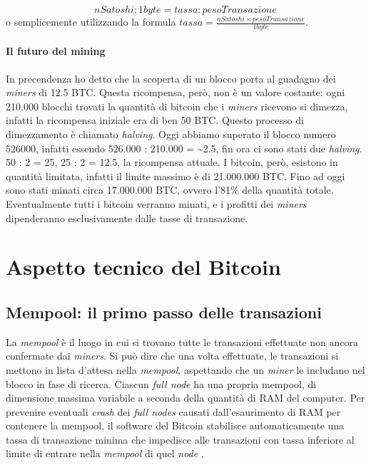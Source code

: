 \documentclass {article}
\begin{document}
$$ nSatoshi : 1 byte = tassa : pesoTransazione $$
%
o semplicemente utilizzando la formula $tassa = \frac{nSatoshi \times pesoTransazione}{1 byte}$.

\paragraph {Il futuro del mining}

In precendenza ho detto che la scoperta di un blocco porta al guadagno dei \textit{miners} di 12.5 BTC.
Questa ricompensa, però, non è un valore costante: ogni 210.000 blocchi trovati la quantità di bitcoin che i \textit{miners} ricevono si dimezza, infatti la ricompensa iniziale era di ben 50 BTC. Questo processo di dimezzamento è chiamato \textit{halving}.
Oggi abbiamo superato il blocco numero 526000, infatti essendo 526.000 : 210.000 = \textasciitilde 2.5, fin ora ci sono stati due \textit{halving}.
50 : 2 = 25, 25 : 2 = 12.5, la ricompensa attuale.
I bitcoin, però, esistono in quantità limitata, infatti il limite massimo è di 21.000.000 BTC.
Fino ad oggi sono stati minati circa 17.000.000 BTC, ovvero l'81\% della quantità totale.
Eventualmente tutti i bitcoin verranno minati, e i profitti dei \textit{miners} dipenderanno esclusivamente dalle tasse di transazione.


\newpage
\null
\newpage


\section {Aspetto tecnico del Bitcoin}


\subsection {Mempool: il primo passo delle transazioni}


La \textit{mempool} è il luogo in cui si trovano tutte le transazioni effettuate non ancora confermate dai \textit{miners}.
Si può dire che una volta effettuate, le transazioni si mettono in lista d'attesa nella \textit{mempool}, aspettando che un \textit{miner} le includano nel blocco in fase di ricerca.
Ciascun \textit{full node} ha una propria mempool, di dimensione massima variabile a seconda della quantità di RAM del computer.
Per prevenire eventuali \textit{crash} dei \textit{full nodes} causati dall'esaurimento di RAM per contenere la mempool, il software del Bitcoin stabilisce automaticamente una tassa di transazione minima che impedisce alle transazioni con tassa inferiore al limite di entrare nella \textit{mempool} di quel \textit{node} \cite{mempool}.
\end{document}
